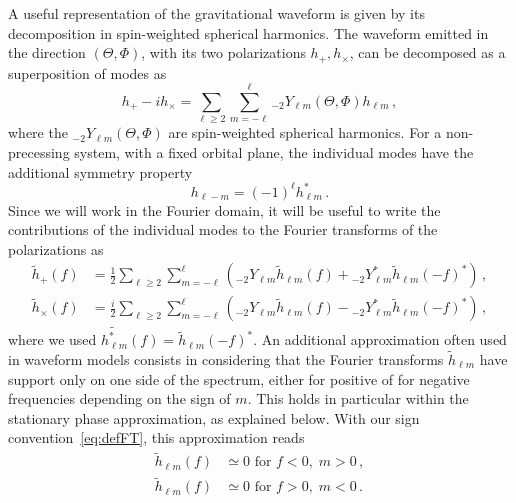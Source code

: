 \documentclass[aps,showpacs,twocolumn,
prd,superscriptaddress,nofootinbib]{revtex4-1}
\newcommand{\be}{\begin{equation}}
\newcommand{\ee}{\end{equation}}
\newcommand{\nn}{\nonumber}
\begin{document}
A useful representation of the gravitational waveform is given by its decomposition in spin-weighted spherical harmonics. The waveform emitted in the direction $(\Theta, \Phi)$, with its two polarizations $h_{+},h_{\times}$, can be decomposed as a superposition of modes as~\cite{Thorne80}
\be\label{eq:defmodes}
	h_{+} - i h_{\times} = \sum\limits_{\ell \geq 2} \sum\limits_{m=-\ell}^{\ell} {}_{-2}Y_{\ell m}(\Theta,\Phi) h_{\ell m} \,,
\ee
where the ${}_{-2}Y_{\ell m}(\Theta,\Phi)$ are spin-weighted spherical harmonics. For a non-precessing system, with a fixed orbital plane, the individual modes have the additional symmetry property
\be\label{eq:symmetryhlminusm}
	h_{\ell -m} = (-1)^{\ell} h_{\ell m}^{*} \,.
\ee
Since we will work in the Fourier domain, it will be useful to write the contributions of the individual modes to the Fourier transforms of the polarizations as
\begin{subequations}\label{eq:hpcfrommodes}
\begin{align}
	\tilde{h}_{+}(f) &= \frac{1}{2} \sum\limits_{\ell \geq 2} \sum\limits_{m=-\ell}^{\ell} \left( {}_{-2}Y_{\ell m} \tilde{h}_{\ell m}(f) + {}_{-2}Y_{\ell m}^{*} \tilde{h}_{\ell m}(-f)^{*} \right) \,, \\
	\tilde{h}_{\times}(f) &= \frac{i}{2} \sum\limits_{\ell \geq 2} \sum\limits_{m=-\ell}^{\ell} \left( {}_{-2}Y_{\ell m} \tilde{h}_{\ell m}(f) - {}_{-2}Y_{\ell m}^{*} \tilde{h}_{\ell m}(-f)^{*} \right) \,,
\end{align}
\end{subequations}
where we used $\widetilde{h_{\ell m}^{*}}(f) = \tilde{h}_{\ell m}(-f)^{*}$. An additional approximation often used in waveform models consists in considering that the Fourier transforms $\tilde{h}_{\ell m}$ have support only on one side of the spectrum, either for positive of for negative frequencies depending on the sign of $m$. This holds in particular within the stationary phase approximation, as explained below. With our sign convention~\eqref{eq:defFT}, this approximation reads
\begin{align}\label{eq:zeronegativef}
	\tilde{h}_{\ell m} (f) &\simeq 0 \text{ for } f<0, \; m>0 \nn\,,\\
	\tilde{h}_{\ell m} (f) &\simeq 0 \text{ for } f>0, \; m<0 \,.
\end{align}
\end{document}
